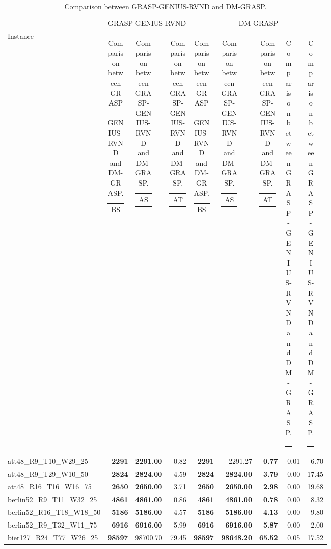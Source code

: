 \documentclass{singlecol-new}
\begin{document}
{\scriptsize
	\begin{longtable}{lrrrrrrrr}
		\caption{Comparison between GRASP-GENIUS-RVND and DM-GRASP.}
		\label{tab:dm-grasp}\\
		\hline
		& \multicolumn{3}{c}{GRASP-GENIUS-RVND} & \multicolumn{5}{c}{DM-GRASP} \\
		\cline{2-9}
		Instance & \begin{tabular}[c]{@{}l@{}}BS \end{tabular} & \begin{tabular}[c]{@{}l@{}}AS\end{tabular} & \begin{tabular}[r]{@{}l@{}}AT \end{tabular} & \begin{tabular}[r]{@{}l@{}}BS\end{tabular} & \begin{tabular}[c]{@{}l@{}}AS\end{tabular} & \begin{tabular}[r]{@{}l@{}}AT\end{tabular} & \begin{tabular}[c]{@{}l@{}}$Dif_{BS}$\end{tabular} & \begin{tabular}[c]{@{}l@{}}$Dif_{AT}$\end{tabular} \\
		\hline
		\endhead	
		att48\_R9\_T10\_W29\_25 & \textbf{2291} & \textbf{2291.00} & 0.82 & \textbf{2291} & 2291.27 & \textbf{0.77} & -0.01 & 6.70 \\
		att48\_R9\_T29\_W10\_50 & \textbf{2824} & \textbf{2824.00} & 4.59 & \textbf{2824} & \textbf{2824.00} & \textbf{3.79} & 0.00 & 17.45 \\
		att48\_R16\_T16\_W16\_75 & \textbf{2650} & \textbf{2650.00} & 3.71 & \textbf{2650} & \textbf{2650.00} & \textbf{2.98} & 0.00 & 19.68 \\
		berlin52\_R9\_T11\_W32\_25 & \textbf{4861} & \textbf{4861.00} & 0.86 & \textbf{4861} & \textbf{4861.00} & \textbf{0.78} & 0.00 & 8.32 \\
		berlin52\_R16\_T18\_W18\_50 & \textbf{5186} & \textbf{5186.00} & 4.57 & \textbf{5186} & \textbf{5186.00} & \textbf{4.13} & 0.00 & 9.80 \\
		berlin52\_R9\_T32\_W11\_75 & \textbf{6916} & \textbf{6916.00} & 5.99 & \textbf{6916} & \textbf{6916.00} & \textbf{5.87} & 0.00 & 2.00 \\
		bier127\_R24\_T77\_W26\_25 & \textbf{98597} & 98700.70 & 79.45 & \textbf{98597} & \textbf{98648.20} & \textbf{65.52} & 0.05 & 17.52 \\

\end{longtable}}
\end{document}
